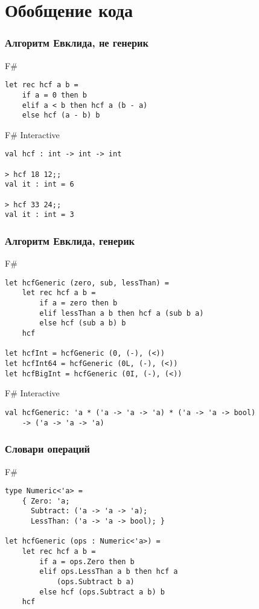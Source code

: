 \documentclass[xetex,mathserif,serif]{beamer}
\begin{document}
	\section{Обобщение кода}

	\begin{frame}[fragile]
		\frametitle{Алгоритм Евклида, не генерик}
		\begin{exampleblock}{F\#}
			\begin{lstlisting}
let rec hcf a b =
    if a = 0 then b
    elif a < b then hcf a (b - a)
    else hcf (a - b) b
\end{lstlisting}
\end{exampleblock}

\begin{alertblock}{F\# Interactive}
\begin{lstlisting}[keywordstyle=\color{black}]
val hcf : int -> int -> int

> hcf 18 12;;
val it : int = 6

> hcf 33 24;;
val it : int = 3
\end{lstlisting}
\end{alertblock}
\end{frame}

	\begin{frame}[fragile]
		\frametitle{Алгоритм Евклида, генерик}
		\begin{exampleblock}{F\#}
			\begin{lstlisting}
let hcfGeneric (zero, sub, lessThan) =
    let rec hcf a b =
        if a = zero then b
        elif lessThan a b then hcf a (sub b a)
        else hcf (sub a b) b
    hcf    
    
let hcfInt = hcfGeneric (0, (-), (<))
let hcfInt64 = hcfGeneric (0L, (-), (<))
let hcfBigInt = hcfGeneric (0I, (-), (<))
\end{lstlisting}
\end{exampleblock}

\begin{alertblock}{F\# Interactive}
\begin{lstlisting}[keywordstyle=\color{black}]
val hcfGeneric: 'a * ('a -> 'a -> 'a) * ('a -> 'a -> bool) 
    -> ('a -> 'a -> 'a)
\end{lstlisting}
\end{alertblock}
\end{frame}

	\begin{frame}[fragile]
		\frametitle{Словари операций}
		\begin{exampleblock}{F\#}
			\begin{lstlisting}
type Numeric<'a> =
    { Zero: 'a;
      Subtract: ('a -> 'a -> 'a);
      LessThan: ('a -> 'a -> bool); }

let hcfGeneric (ops : Numeric<'a>) =
    let rec hcf a b =
        if a = ops.Zero then b
        elif ops.LessThan a b then hcf a 
            (ops.Subtract b a)
        else hcf (ops.Subtract a b) b
    hcf
\end{lstlisting}
\end{exampleblock}
\end{frame}
\end{document}
